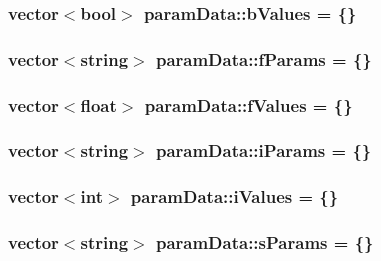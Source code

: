 \subsubsection[{b\+Values}]{\setlength{\rightskip}{0pt plus 5cm}vector$<$bool$>$ param\+Data\+::b\+Values = \{\}}\label{structparam_data_a0e70736d8fef01a994cb6282dcdcfc54}
\hypertarget{structparam_data_a645656536b9d6a8f716effeae49acbab}{}
\subsubsection[{f\+Params}]{\setlength{\rightskip}{0pt plus 5cm}vector$<$string$>$ param\+Data\+::f\+Params = \{\}}\label{structparam_data_a645656536b9d6a8f716effeae49acbab}
\hypertarget{structparam_data_aded9de47eea4d3861aed3c649511648d}{}
\subsubsection[{f\+Values}]{\setlength{\rightskip}{0pt plus 5cm}vector$<$float$>$ param\+Data\+::f\+Values = \{\}}\label{structparam_data_aded9de47eea4d3861aed3c649511648d}
\hypertarget{structparam_data_ab973b0f2e408f0075b474e94f0b62fc5}{}
\subsubsection[{i\+Params}]{\setlength{\rightskip}{0pt plus 5cm}vector$<$string$>$ param\+Data\+::i\+Params = \{\}}\label{structparam_data_ab973b0f2e408f0075b474e94f0b62fc5}
\hypertarget{structparam_data_a524931886354bfbd088178860999f9e1}{}
\subsubsection[{i\+Values}]{\setlength{\rightskip}{0pt plus 5cm}vector$<$int$>$ param\+Data\+::i\+Values = \{\}}\label{structparam_data_a524931886354bfbd088178860999f9e1}
\hypertarget{structparam_data_a19da62f881dccbf0f63c423e896ad8d1}{}
\subsubsection[{s\+Params}]{\setlength{\rightskip}{0pt plus 5cm}vector$<$string$>$ param\+Data\+::s\+Params = \{\}}\label{structparam_data_a19da62f881dccbf0f63c423e896ad8d1}
\hypertarget{structparam_data_a530e1ec7867fb4713b34a1dfa0cffe14}{}
